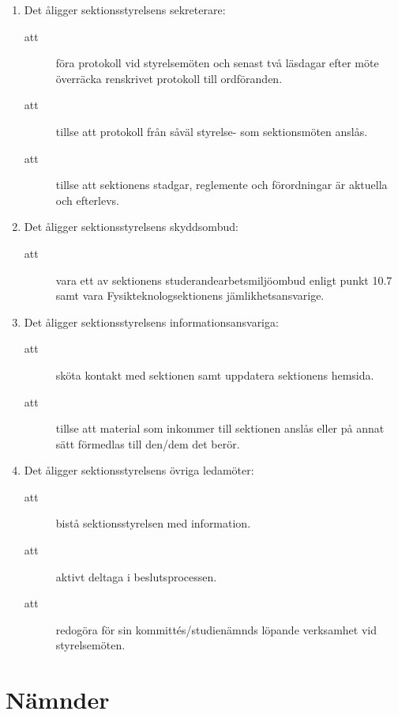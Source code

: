 \documentclass[11pt,a4paper]{article}
\begin{document}
\begin{enumerate}[\thesubsection .1]
  \item Det åligger sektionsstyrelsens sekreterare:
    \begin{description}
      \item[att] föra protokoll vid styrelsemöten och senast två läsdagar efter möte överräcka renskrivet protokoll till ordföranden.
      \item[att] tillse att protokoll från såväl styrelse- som sektionsmöten anslås.
      \item[att] tillse att sektionens stadgar, reglemente och förordningar är aktuella och efterlevs.
    \end{description}

  \item Det åligger sektionsstyrelsens skyddsombud:
    \begin{description}
      \item[att] vara ett av sektionens studerandearbetsmiljöombud
      enligt punkt 10.7 samt vara Fys\-ik\-teknolog\-sektionens jämlikhetsansvarige.
    \end{description}
    
  \item Det åligger sektionsstyrelsens informationsansvariga:  
    \begin{description}
      \item[att] sköta kontakt med sektionen samt uppdatera sektionens hemsida. 
      \item[att] tillse att material som inkommer till sektionen anslås eller på annat sätt förmedlas  till den/dem det berör.
    \end{description}    

  \item Det åligger sektionsstyrelsens  övriga ledamöter:
    \begin{description}
      \item[att] bistå sektionsstyrelsen med information.
      \item[att] aktivt deltaga i beslutsprocessen.
      \item[att] redogöra för sin kommittés/studienämnds löpande verksamhet vid styrel\-se\-möten.
      
    \end{description}
\end{enumerate}


\newpage

\section{Nämnder}
\end{document}

